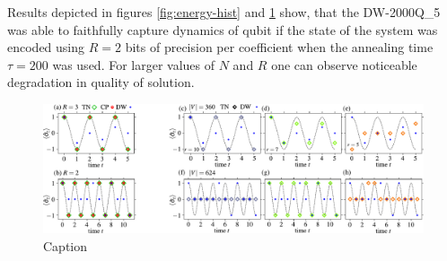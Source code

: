 Results depicted in figures \ref{fig:energy-hist} and \ref{fig:cplex_tn_dwave} show, that the DW-2000Q\_{5} was able to faithfully capture dynamics of qubit if the state of the system was encoded using $R=2$ bits of precision per coefficient when the annealing time $\tau=200$ was used. For larger values of $N$ and $R$ one can observe noticeable degradation in quality of solution.

\begin{figure}
    \centering
    \includegraphics[width=\textwidth]{figures/fig34_merge.pdf}
    \caption{Caption}
    \label{fig:cplex_tn_dwave}
\end{figure}


